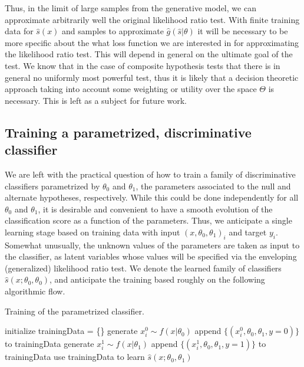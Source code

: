 \documentclass[11pt, oneside]{article}   	%
\begin{document}

Thus, in the  limit of large samples from the generative model,  we can approximate arbitrarily well the original likelihood ratio test. With finite training data for $\hat{s}(x)$ and samples to approximate $\hat{g}(\hat{s}|\theta)$ it will be necessary to be more specific about the what loss function we are interested in for approximating the likelihood ratio test. This will depend in general on the ultimate goal of the test. We know that in the case of composite hypothesis tests that there is in general no uniformly most powerful test, thus it is likely that a decision theoretic approach taking into account some weighting or utility over the space $\Theta$ is necessary. This is left as a subject for future work.


\subsection{Training a parametrized, discriminative classifier}

We are left with the practical question of how to train a family of discriminative classifiers parametrized by $\theta_0$ and $\theta_1$, the 
parameters associated to the null and alternate hypotheses, respectively. While this could be done independently
for all $\theta_0$ and $\theta_1$, it is desirable and convenient to have a smooth evolution of the classification score as a function of the parameters. Thus, we anticipate a single learning stage based on training data with input $(x, \theta_0, \theta_1)_i$ and target $y_i$. Somewhat unusually, the unknown values of the parameters are taken
as input to the classifier, as latent variables whose values will be specified via the enveloping (generalized) likelihood ratio test. We denote the learned family of classifiers $\hat{s}(x; \theta_0, \theta_0)$, and anticipate the training based roughly on the following algorithmic flow.
\begin{algorithm}[ht]
\caption{Training of the parametrized classifier.}\label{alg:training}
\begin{algorithmic}
\STATE initialize trainingData = \{\}
		\STATE generate $x_i^0 \sim f(x|\theta_0)$
		\STATE append $\{ (x_i^0, \theta_0, \theta_1, y=0) \}$ to trainingData
		\STATE generate $x_i^1 \sim f(x|\theta_1)$
		\STATE append $\{ (x_i^1, \theta_0, \theta_1, y=1) \}$ to trainingData
	\ENDFOR
\ENDFOR
\STATE use trainingData to learn $\hat{s}(x; \theta_0, \theta_1)$
\end{algorithmic}
\end{algorithm}%
\end{document}
